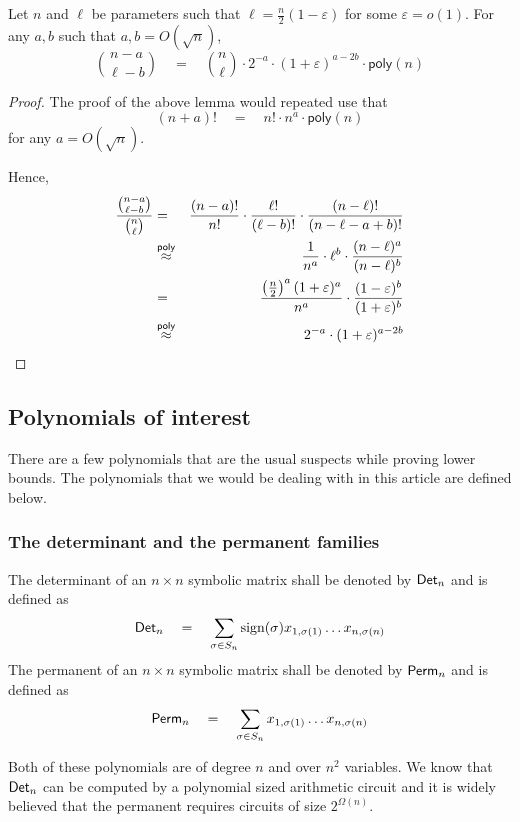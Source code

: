 \documentclass{beatcs}
\newcommand{\poly}{\mathsf{poly}}
\newcommand{\spaced}[1]{\quad#1\quad}
\renewcommand{\epsilon}{\varepsilon}
\begin{document}
\begin{lemma}\label{lem:binom-approx}
Let $n$ and $\ell$ be parameters such that $\ell = \frac{n}{2}(1 - \epsilon)$ for some $\epsilon = o(1)$. For any $a, b$ such that $a,b = O(\sqrt{n})$, 
\[
\binom{n - a}{\ell - b} \quad = \quad \binom{n}{\ell} \cdot 2^{-a} \cdot (1+\epsilon)^{a-2b} \cdot \poly(n)
\]
\end{lemma}
\begin{proof}
The proof of the above lemma would repeated use \cite[Lemma 6]{gkks13} that 
\[
(n+a)! \quad = \quad n! \cdot n^{a} \cdot \poly(n)
\]
for any $a = O(\sqrt{n})$. 

Hence,
\begin{eqnarray*}
\frac{\binom{n-a}{\ell -b}}{\binom{n}{\ell}} & = & \frac{(n-a)!}{n!} \cdot \frac{\ell!}{(\ell -b)!}\cdot \frac{(n-\ell)!}{(n-\ell-a+b)!}\\
& \stackrel{\poly}{\approx}& \frac{1}{n^a} \cdot \ell^b \cdot \frac{(n-\ell)^a}{(n-\ell)^b}\\
& = & \frac{\inparen{\frac{n}{2}}^a(1 +\epsilon)^a}{n^a} \cdot \frac{(1-\epsilon)^{b}}{(1+\epsilon)^b}\\
& \stackrel{\poly}{\approx} & 2^{-a} \cdot (1+\epsilon)^{a - 2b}
\end{eqnarray*}
\end{proof}

\subsection{Polynomials of interest}

There are a few polynomials that are the usual suspects while proving lower bounds. The polynomials that we would be dealing with in this article are defined below. 

\subsubsection*{The determinant and the permanent families}

The determinant of an $n\times n$ symbolic matrix shall be denoted by $\mathsf{Det}_n$ and is defined as
\[
\Det_n \spaced{=} \sum_{\sigma \in S_n} \text{sign}(\sigma) x_{1,\sigma(1)}\dots x_{n,\sigma(n)}
\]
The permanent of an $n\times n$ symbolic matrix shall be denoted by $\mathsf{Perm}_n$ and is defined as
\[
\Perm_n \spaced{=} \sum_{\sigma \in S_n}x_{1,\sigma(1)}\dots x_{n,\sigma(n)}
\]

Both of these polynomials are of degree $n$ and over $n^2$ variables. We know that $\mathsf{Det}_n$ can be computed by a polynomial sized arithmetic circuit and it is widely believed that the permanent requires circuits of size $2^{\Omega(n)}$. 
\end{document}
